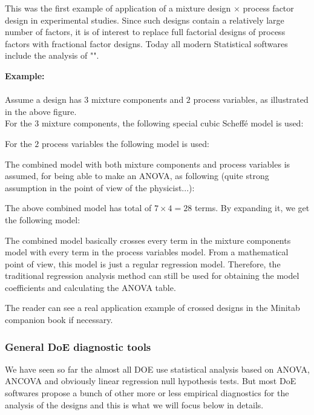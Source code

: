 	This was the first example of application of a mixture design $\times$ process factor design in experimental studies. Since such designs contain a relatively large number of factors, it is of interest to replace full factorial designs of process factors with fractional factor designs. Today all modern Statistical softwares include the analysis of "".
	\begin{tcolorbox}[colframe=black,colback=white,sharp corners]
	\textbf{{\Large {}}Example:}\\\\
	Assume a design has $3$ mixture components and $2$ process variables, as illustrated in the above figure.\\
	
	For the $3$ mixture components, the following special cubic Scheffé model is used:
	
	For the $2$ process variables the following model is used:
	
	The combined model with both mixture components and process variables is assumed, for being able to make an ANOVA, as following (quite strong assumption in the point of view of the physicist...):
	
	The above combined model has total of $7\times 4=28$ terms. By expanding it, we get the following model:
	
	The combined model basically crosses every term in the mixture components model with every term in the process variables model. From a mathematical point of view, this model is just a regular regression model. Therefore, the traditional regression analysis method can still be used for obtaining the model coefficients and calculating the ANOVA table.
	\end{tcolorbox}
	The reader can see a real application example of crossed designs in the Minitab companion book if necessary.
	
	\pagebreak
	\pagebreak
	\subsubsection{General DoE diagnostic tools}
	We have seen so far the almost all DOE use statistical analysis based on ANOVA, ANCOVA and obviously linear regression null hypothesis tests. But most DoE softwares propose a bunch of other more or less empirical diagnostics for the analysis of the designs and this is what we will focus below in details.
	

